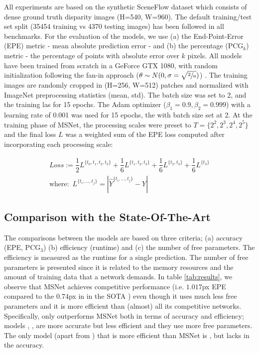 \documentclass[runningheads]{llncs}
\begin{document}
All experiments are based on the synthetic SceneFlow dataset \cite{MIFDB16} which consists of dense ground truth disparity images (H=540, W=960). The 
default training/test set split (35454 training vs 4370 testing images) has been followed in all benchmarks. For the evaluation of the models, we use (a) the End-Point-Error (EPE) metric - mean absolute prediction error - and (b) the percentage ($\text{PCG}_k$) metric - the percentage of points with absolute error over $k$ pixels. All models have been trained from scratch in a GeForce GTX 1080, with random initialization following the fan-in approach ($\theta \sim N(0,\sigma=\sqrt{\sfrac{2}{n}})$) \cite{He2015}. The training images are randomly cropped in (H=256, W=512) patches and normalized with ImageNet preprocessing statistics (mean, std). The batch size was set to 2, and the training las for 15 epochs. The Adam optimizer ($\beta_1 = 0.9, \beta_2=0.999$) with a learning rate of 0.001 was used for 15 epochs, the with batch size set at 2. At the training phase of MSNet, the processing scales were preset to $T= \{2^2, 2^3, 2^4, 2^5\}$ and the final loss $L$ was a weighted sum of the EPE loss computed after incorporating each processing scale:

\begin{gather}
\textit{Loss} := \dfrac{1}{2}L^{\{t_0, t_1, t_2, t_3\}} +  \dfrac{1}{6}L^{\{t_1, t_2, t_3\}} + \dfrac{1}{6}L^{\{t_2, t_3\}} + \dfrac{1}{6}L^{\{t_3\}}\\
\text{where:} \; \ L^{\{t_i, ..., t_j\}} = |\hat{Y}^{\{t_i, ..., t_j\}} - Y |    
\end{gather}{}


\subsection{Comparison with the State-Of-The-Art}

The comparisons between the models are based on three criteria; (a) accuracy (EPE, $\text{PCG}_3$) (b) efficiency (runtime) and (c) the number of free parameters. The efficiency is measured as the runtime for a single prediction. The number of free parameters is presented since it is related to the memory resources and the amount of training data that a network demands. In table \ref{tab:results}, we observe that MSNet achieves competitive performance (i.e. $1.017$px EPE compared to the $0.74$px in in the SOTA \cite{du2019amnet}) even though it uses much less free parameters and it is more efficient than (almost) all its competitive networks. Specifically, only \cite{Duggal2019ICCV} outperforms MSNet both in terms of accuracy and efficiency; models \cite{cheng2018learning}, \cite{du2019amnet}, \cite{zhang2019ga} are more accurate but less efficient and they use more free parameters. The only model (apart from \cite{Duggal2019ICCV}) that is more efficient than MSNet is \cite{Mayer2016ALD}, but lacks in the accuracy.
\end{document}
